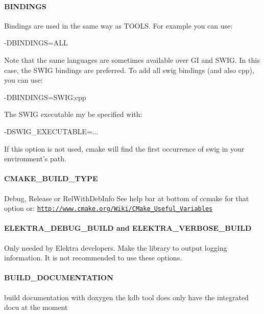\paragraph*{B\+I\+N\+D\+I\+N\+G\+S}

Bindings are used in the same way as T\+O\+O\+L\+S. For example you can use\+: \begin{DoxyVerb}    -DBINDINGS=ALL
\end{DoxyVerb}


Note that the same languages are sometimes available over G\+I and S\+W\+I\+G. In this case, the S\+W\+I\+G bindings are preferred. To add all swig bindings (and also cpp), you can use\+: \begin{DoxyVerb}    -DBINDINGS=SWIG;cpp
\end{DoxyVerb}


The S\+W\+I\+G executable my be specified with\+: \begin{DoxyVerb}    -DSWIG_EXECUTABLE=...
\end{DoxyVerb}


If this option is not used, cmake will find the first occurrence of {\ttfamily swig} in your environment's path.

\paragraph*{C\+M\+A\+K\+E\+\_\+\+B\+U\+I\+L\+D\+\_\+\+T\+Y\+P\+E}

Debug, Release or Rel\+With\+Deb\+Info See help bar at bottom of ccmake for that option or\+: \href{http://www.cmake.org/Wiki/CMake_Useful_Variables}{\tt http\+://www.\+cmake.\+org/\+Wiki/\+C\+Make\+\_\+\+Useful\+\_\+\+Variables}

\paragraph*{E\+L\+E\+K\+T\+R\+A\+\_\+\+D\+E\+B\+U\+G\+\_\+\+B\+U\+I\+L\+D and E\+L\+E\+K\+T\+R\+A\+\_\+\+V\+E\+R\+B\+O\+S\+E\+\_\+\+B\+U\+I\+L\+D}

Only needed by Elektra developers. Make the library to output logging information. It is not recommended to use these options.

\paragraph*{B\+U\+I\+L\+D\+\_\+\+D\+O\+C\+U\+M\+E\+N\+T\+A\+T\+I\+O\+N}

build documentation with doxygen the kdb tool does only have the integrated docu at the moment

